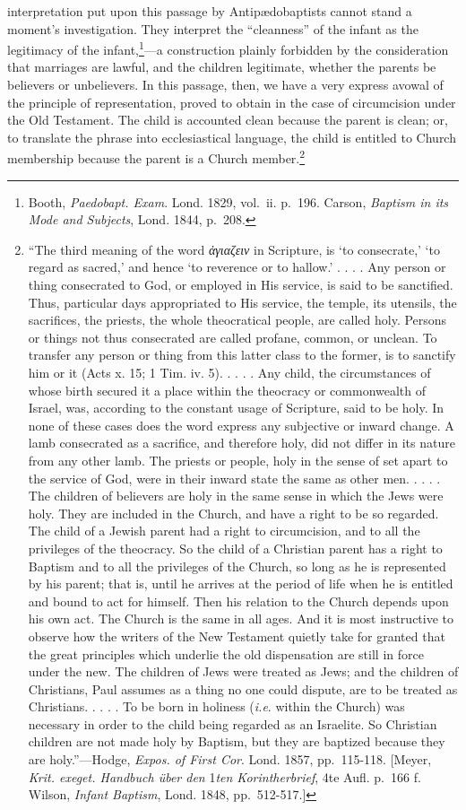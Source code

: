 \documentclass[]{book}
\begin{document}
interpretation put upon this passage by Antipædobaptists cannot stand a moment's investigation. They interpret the ``cleanness'' of the infant as the legitimacy of the infant,\footnote{Booth, \emph{Paedobapt. Exam}. Lond. 1829, vol.~ii. p.~196. Carson, \emph{Baptism in its Mode and Subjects}, Lond. 1844, p.~208.}---a construction plainly forbidden by the consideration that marriages are lawful, and the children legitimate, whether the parents be believers or unbelievers. In this passage, then, we have a very express avowal of the principle of representation, proved to obtain in the case of circumcision under the Old Testament. The child is accounted clean because the parent is clean; or, to translate the phrase into ecclesiastical language, the child is entitled to Church membership because the parent is a Church member.\footnote{``The third meaning of the word \emph{ἁγιαζειν} in Scripture, is `to consecrate,' `to regard as sacred,' and hence `to reverence or to hallow.' . . . . Any person or thing consecrated to God, or employed in His service, is said to be sanctified. Thus, particular days appropriated to His service, the temple, its utensils, the sacrifices, the priests, the whole theocratical people, are called holy. Persons or things not thus consecrated are called profane, common, or unclean. To transfer any person or thing from this latter class to the former, is to sanctify him or it (Acts x. 15; 1 Tim. iv. 5). . . . . Any child, the circumstances of whose birth secured it a place within the theocracy or commonwealth of Israel, was, according to the constant usage of Scripture, said to be holy. In none of these cases does the word express any subjective or inward change. A lamb consecrated as a sacrifice, and therefore holy, did not differ in its nature from any other lamb. The priests or people, holy in the sense of set apart to the service of God, were in their inward state the same as other men. . . . . The children of believers are holy in the same sense in which the Jews were holy. They are included in the Church, and have a right to be so regarded. The child of a Jewish parent had a right to circumcision, and to all the privileges of the theocracy. So the child of a Christian parent has a right to Baptism and to all the privileges of the Church, so long as he is represented by his parent; that is, until he arrives at the period of life when he is entitled and bound to act for himself. Then his relation to the Church depends upon his own act. The Church is the same in all ages. And it is most instructive to observe how the writers of the New Testament quietly take for granted that the great principles which underlie the old dispensation are still in force under the new. The children of Jews were treated as Jews; and the children of Christians, Paul assumes as a thing no one could dispute, are to be treated as Christians. . . . . To be born in holiness (\emph{i.e}. within the Church) was necessary in order to the child being regarded as an Israelite. So Christian children are not made holy by Baptism, but they are baptized because they are holy.''---Hodge, \emph{Expos. of First Cor}. Lond. 1857, pp.~115-118. {[}Meyer, \emph{Krit. exeget. Handbuch über den} 1\emph{ten Korintherbrief}, 4te Aufl. p.~166 f. Wilson, \emph{Infant Baptism}, Lond. 1848, pp.~512-517.{]}} 
\end{document}
